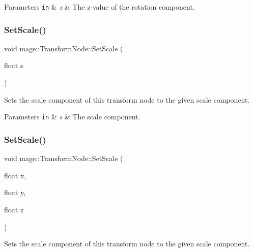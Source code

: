 \begin{DoxyParams}[1]{Parameters}
\mbox{\tt in}  & {\em z} & The z-\/value of the rotation component. \\
\hline
\end{DoxyParams}
\hypertarget{classmage_1_1_transform_node_af85bcef02284aab46c597dde0331c7de}{}\label{classmage_1_1_transform_node_af85bcef02284aab46c597dde0331c7de} 
\subsubsection{\texorpdfstring{Set\+Scale()}{SetScale()}\hspace{0.1cm}{\footnotesize\ttfamily [1/4]}}
{\footnotesize\ttfamily void mage\+::\+Transform\+Node\+::\+Set\+Scale (\begin{DoxyParamCaption}\item[{float}]{s }\end{DoxyParamCaption})}

Sets the scale component of this transform node to the given scale component.


\begin{DoxyParams}[1]{Parameters}
\mbox{\tt in}  & {\em s} & The scale component. \\
\hline
\end{DoxyParams}
\hypertarget{classmage_1_1_transform_node_a2921532479b9d41a4df04ef298dc0e20}{}\label{classmage_1_1_transform_node_a2921532479b9d41a4df04ef298dc0e20} 
\subsubsection{\texorpdfstring{Set\+Scale()}{SetScale()}\hspace{0.1cm}{\footnotesize\ttfamily [2/4]}}
{\footnotesize\ttfamily void mage\+::\+Transform\+Node\+::\+Set\+Scale (\begin{DoxyParamCaption}\item[{float}]{x,  }\item[{float}]{y,  }\item[{float}]{z }\end{DoxyParamCaption})}

Sets the scale component of this transform node to the given scale component.


